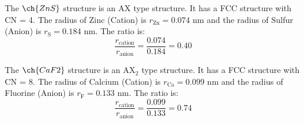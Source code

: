 \documentclass[11pt]{article}
\begin{document}
\begin{example}
    The $\ch{ZnS}$ structure is an AX type structure. It has a FCC structure with CN = 4. The radius of Zinc (Cation) is $r_{\text{Zn}} = 0.074$ nm and the radius of Sulfur (Anion) is $r_{\text{S}} = 0.184$ nm. The ratio is:
    $$ \frac{r_{\text{cation}}}{r_{\text{anion}}} = \frac{0.074}{0.184} = 0.40 $$
\end{example}
\begin{example}
    The $\ch{CaF2}$ structure is an AX$_2$ type structure. It has a FCC structure with CN = 8. The radius of Calcium (Cation) is $r_{\text{Ca}} = 0.099$ nm and the radius of Fluorine (Anion) is $r_{\text{F}} = 0.133$ nm. The ratio is:
    $$ \frac{r_{\text{cation}}}{r_{\text{anion}}} = \frac{0.099}{0.133} = 0.74 $$
\end{example}

\end{document}
